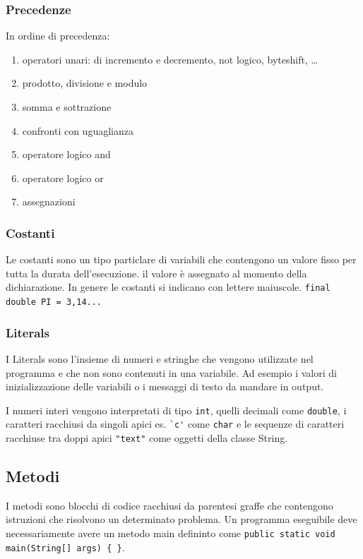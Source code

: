 \documentclass[a4paper]{article}
\begin{document}
\subsubsection*{Precedenze}
In ordine di precedenza:
\begin{enumerate}[topsep=3pt, itemsep=0pt]
	\item operatori unari: di incremento e decremento, not logico, byteshift, \dots
	\item prodotto, divisione e modulo
	\item somma e sottrazione
	\item confronti con uguaglianza
	\item operatore logico and
	\item operatore logico or
	\item assegnazioni
\end{enumerate}

\subsubsection*{Costanti}
Le costanti sono un tipo particlare di variabili che contengono un valore fisso per tutta la durata dell'esecuzione.
il valore è assegnato al momento della dichiarazione. In genere le costanti si indicano con lettere maiuscole.
\verb|final double PI = 3,14...|

\subsubsection*{Literals}
I Literals sono l'insieme di numeri e stringhe che vengono utilizzate nel programma e che non sono contenuti in una variabile.
Ad esempio i valori di inizializzazione delle variabili o i messaggi di testo da mandare in output.

I numeri interi vengono interpretati di tipo \verb|int|, quelli decimali come \verb|double|, i caratteri racchiusi da singoli
apici es. \verb|`c'| come \verb|char| e le sequenze di caratteri racchiuse tra doppi apici \verb|"text"| come oggetti della
classe String.

\newpage


\subsection{Metodi}
I metodi sono blocchi di codice racchiusi da parentesi graffe che contengono istruzioni che risolvono un determinato problema.
Un programma eseguibile deve necessariamente avere un metodo main defininto come \verb|public static void main(String[] args) { }|.
\end{document}
